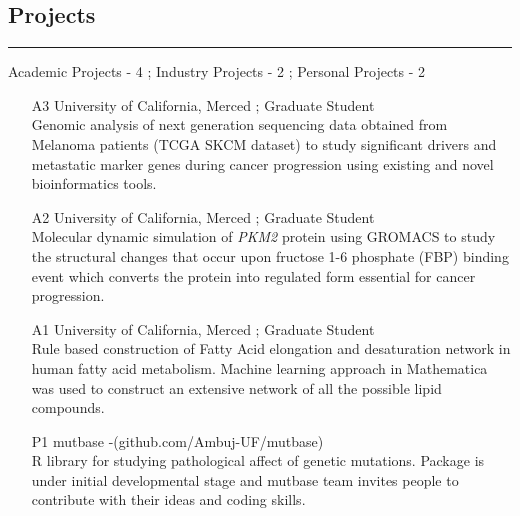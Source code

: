 \documentclass[line,margin]{cv_type2}
\newcommand{\changeurlcolor}[1]{\hypersetup{urlcolor=#1}}
\begin{document}
\begin{resume}
\section{Projects}\hskip 4pt {\color {gray} \hfill \rule {15cm} {0.1pt}}
\begin{itemize}
                {\color{gray} {\small{{Academic Projects - 4 ;} \hskip 10pt {Industry Projects - 2 ;} \hskip 10pt {Personal Projects - 2}}}}
\end{itemize}
                \begin{itemize}
                    \item[A3]
                    {University of California, Merced ; Graduate Student}\\
{\small{Genomic analysis of next generation sequencing data obtained from Melanoma patients (TCGA SKCM dataset) to study significant drivers and metastatic marker genes during cancer progression using existing and novel bioinformatics tools.}}
\vskip 5pt
                    \item[A2]
                    {University of California, Merced ; Graduate Student }\\
{\small{Molecular dynamic simulation of {\it{PKM2}} protein using GROMACS to study the structural changes that occur upon fructose 1-6 phosphate (FBP) binding event which converts the protein into regulated form essential for cancer progression.}}
\vskip 5pt
                    \item[A1]
                    {University of California, Merced ; Graduate Student}\\
{\small{Rule based construction of Fatty Acid elongation and desaturation network in human fatty acid metabolism. Machine learning approach in Mathematica was used to construct an extensive network of all the possible lipid compounds.}}
                    \item[P1]
                    {{mutbase} -(github.com/Ambuj-UF/mutbase) }\\
{\small{R library for studying pathological affect of genetic mutations. Package is under initial developmental stage and mutbase team invites people to contribute with their ideas and coding skills.}}

                \end{itemize}
                \vskip 10pt


\end{resume}
\end{document}
